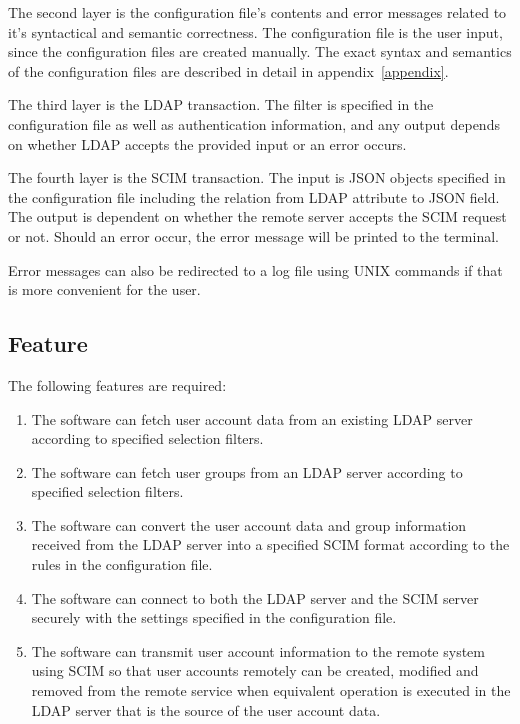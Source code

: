 \documentclass[12pt,twoside,a4paper,titlepage]{article}
\begin{document}
  The second layer is the configuration file's contents and error
  messages related to it's syntactical and semantic correctness. The
  configuration file is the user input, since the configuration files
  are created manually. The exact syntax and semantics of the
  configuration files are described in detail in
  appendix~\ref{appendix}.

  The third layer is the LDAP transaction. The filter is specified
  in the configuration file as well as authentication information,
  and any output depends on whether LDAP accepts the provided input
  or an error occurs.

  The fourth layer is the SCIM transaction. The input is JSON objects
  specified in the configuration file including the relation from
  LDAP attribute to JSON field. The output is dependent on whether
  the remote server accepts the SCIM request or not. Should an error
  occur, the error message will be printed to the terminal.

  Error messages can also be redirected to a log file using UNIX
  commands if that is more convenient for the user.

  \subsection{Feature}

  The following features are required:

  \begin{enumerate}
   \item
    The software can fetch user account data from an existing LDAP
    server according to specified selection filters.

   \item
    The software can fetch user groups from an LDAP server according
    to specified selection filters.

   \item
    The software can convert the user account data and group
    information received from the LDAP server into a specified SCIM
    format according to the rules in the configuration file.

   \item
    The software can connect to both the LDAP server and the SCIM
    server securely with the settings specified in the configuration
    file.

   \item
    The software can transmit user account information to the remote
    system using SCIM so that user accounts remotely can be created,
    modified and removed from the remote service when equivalent
    operation is executed in the LDAP server that is the source of
    the user account data.
  \end{enumerate}
\end{document}
